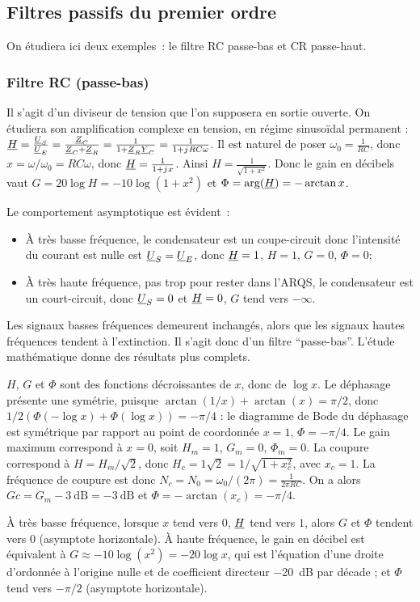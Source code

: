 \subsection{Filtres passifs du premier ordre}
On étudiera ici deux exemples~: le filtre RC passe-bas et CR passe-haut.
\subsubsection{Filtre RC (passe-bas)}
Il s'agit d'un diviseur de tension que l'on supposera en sortie ouverte. On étudiera son amplification complexe en tension, en régime sinusoïdal permanent : $\underline{H} = \frac{\underline{U}_S}{\underline{U}_E} = \frac{\underline{Z}_C}{\underline{Z}_C + \underline{Z}_R} = \frac{1}{1+\underline{Z}_R\underline{Y}_C} = \frac{1}{1+{j\mkern1mu} R C \omega}$. Il est naturel de poser $\omega_0=\frac{1}{RC}$, donc $x=\omega/\omega_0=RC\omega$, donc $\underline{H} = \frac{1}{1+{j\mkern1mu} x}$. Ainsi $H =\frac{1}{\sqrt{1+x^2}}$. Donc le gain en décibels vaut $G = 20\log H = -10\log(1+x^2)$ et $\Phi = \arg(\underline{H})=-\arctan x$.

Le comportement asymptotique est évident~:
\begin{itemize}
	\item À très basse fréquence, le condensateur est un coupe-circuit donc l'intensité du courant est nulle est $\underline{U}_S = \underline{U}_E$, donc $\underline{H}=1$, $H=1$, $G=0$, $\Phi=0$;
	\item À très haute fréquence, pas trop pour rester dans l'ARQS, le condensateur est un court-circuit, donc $\underline{U}_S=0$ et $\underline{H}=0$, $G$ tend vers $-\infty$.
\end{itemize}
Les signaux basses fréquences demeurent inchangés, alors que les signaux hautes fréquences tendent à l'extinction. Il s'agit donc d'un filtre ``passe-bas''. L'étude mathématique donne des résultats plus complets.

$H$, $G$ et $\Phi$ sont des fonctions décroissantes de $x$, donc de $\log x$. Le déphasage présente une symétrie, puisque $\arctan(1/x) + \arctan(x) = \pi/2$, donc $1/2(\Phi(-\log x)+\Phi(\log x)) = -\pi/4$ : le diagramme de Bode du déphasage est symétrique par rapport au point de coordonnée $x=1$, $\Phi=-\pi/4$. Le gain maximum correspond à $x=0$, soit $H_m=1$, $G_m=0$, $\Phi_m=0$. La coupure correspond à $H = H_m/\sqrt{2}$, donc $H_c = 1\sqrt{2} = 1/\sqrt{1+x_c^2}$, avec $x_c=1$. La fréquence de coupure est donc $N_c = N_0 = \omega_0/(2\pi) = \frac{1}{2\pi RC}$. On a alors $Gc = G_m-\SI{3}{\dB}=-\SI{3}{\dB}$ et $\Phi = -\arctan(x_c) = -\pi/4$.

À très basse fréquence, lorsque $x$ tend vers $0$, $\underline{H}$ tend vers $1$, alors $G$ et $\Phi$ tendent vers $0$ (asymptote horizontale). À haute fréquence, le gain en décibel est équivalent à $G \approx -10 \log(x^2) = -20\log x$, qui est l'équation d'une droite d'ordonnée à l'origine nulle et de coefficient directeur \SI{-20}{\dB} par décade ; et $\Phi$ tend vers $-\pi/2$ (asymptote horizontale).

